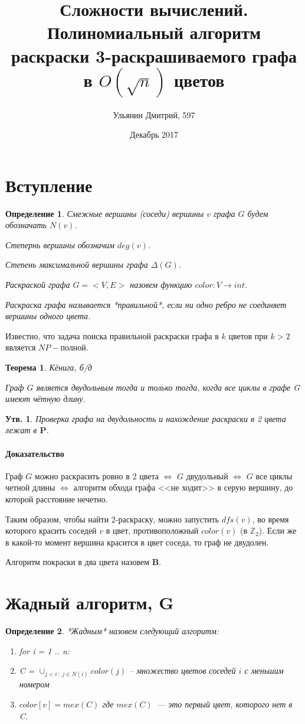 \documentclass{article}
\title{Сложности вычислений. Полиномиальный алгоритм раскраски 3-раскрашиваемого графа в $O(\sqrt{n})$ цветов}
\author{Ульянин Дмитрий, 597}
\date{Декабрь 2017}
\newtheorem{theorem}{Теорема}
\newtheorem{lemma}{Утв.}
\newtheorem{definition}{Определение}
\begin{document}
\maketitle

\section{Вступление}
\begin{definition}
	
	Смежные вершины (соседи) вершины $v$ графа $G$ будем обозначать $N(v)$.
	
	Степернь вершины обозначим $deg(v)$.
	
	Степень максимальной вершины графа $\Delta(G)$.
	
	Раскраской графа $G = <V, E>$ назовем функцию ${color : V \rightarrow int}$.
	
    Раскраска графа называется *правильной*, если ни одно ребро не соединяет вершины одного цвета.
\end{definition}

Известно, что задача поиска правильной раскраски графа в $k$ цветов при ${k > 2}$ является $NP-$полной.

\begin{theorem}{Кёнига, б/д}
	
	Граф $G$ является двудольным тогда и только тогда, когда все циклы в графе G имеют чётную длину.
\end{theorem}

\begin{lemma}
    Проверка графа на двудольность и нахождение раскраски в 2 цвета лежат в $\mathbf{P}$.
\end{lemma}
\paragraph{Доказательство}
	Граф $G$ можно раскрасить ровно в 2 цвета $\iff$ $G$ двудольный $\iff$ $G$ все циклы четной длины $\iff$ алгоритм обхода графа <<не ходит>> в серую вершину, до которой расстояние нечетно.
	
	Таким образом, чтобы найти 2-раскраску, можно запустить $dfs(v)$, во время которого красить соседей $v$ в цвет, противоположный $color(v)$ (в $\mathbb{Z}_2$). Если же в какой-то момент вершина красится в цвет соседа, то граф не двудолен.
	
	Алгоритм покраски в два цвета назовем $\textbf{B}$.

\section{Жадный алгоритм, \textbf{G}}
\begin{definition}
    *Жадным* назовем следующий алгоритм:
    \begin{enumerate}
    	\item for i = 1 .. n:
    	\item C = $\cup_{j<i\ :\ j \in N(i)} {color(j)}$ -- множество цветов соседей $i$ с меньшим номером
    	\item $color[v] = mex(C)$ где $mex(C)$~--- это первый цвет, которого нет в C.
    \end{enumerate}
\end{definition} 
\end{document}
